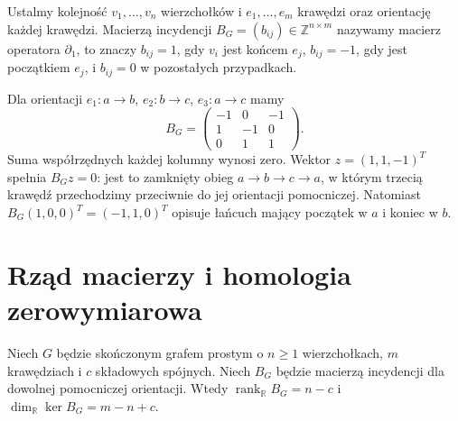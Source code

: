 \begin{definicja}
Ustalmy kolejność $v_1,\ldots,v_n$ wierzchołków i $e_1,\ldots,e_m$
krawędzi oraz orientację każdej krawędzi. Macierzą incydencji
$B_G=(b_{ij})\in\mathbb Z^{n\times m}$ nazywamy macierz operatora
$\partial_1$, to znaczy $b_{ij}=1$, gdy $v_i$ jest końcem $e_j$,
$b_{ij}=-1$, gdy jest początkiem $e_j$, i $b_{ij}=0$ w pozostałych
przypadkach.
\end{definicja}

\begin{center}
\end{center}

\begin{przyklad}
Dla orientacji $e_1:a\to b$, $e_2:b\to c$, $e_3:a\to c$ mamy
\[
B_G=\begin{pmatrix}-1&0&-1\\1&-1&0\\0&1&1\end{pmatrix}.
\]
Suma współrzędnych każdej kolumny wynosi zero. Wektor $z=(1,1,-1)^T$ spełnia
$B_Gz=0$: jest to zamknięty obieg $a\to b\to c\to a$, w którym
trzecią krawędź przechodzimy przeciwnie do jej orientacji pomocniczej.
Natomiast $B_G(1,0,0)^T=(-1,1,0)^T$ opisuje łańcuch mający początek
w $a$ i koniec w $b$.
\end{przyklad}

\section{Rząd macierzy i homologia zerowymiarowa}
\label{sec:tg-rank-incidence}

\begin{twierdzenie}
\label{thm:tg-rank}
Niech $G$ będzie skończonym grafem prostym o $n\ge1$ wierzchołkach,
$m$ krawędziach i $c$ składowych spójnych. Niech $B_G$ będzie
macierzą incydencji dla dowolnej pomocniczej orientacji. Wtedy
$\operatorname{rank}_{\mathbb R}B_G=n-c$ i
$\dim_{\mathbb R}\ker B_G=m-n+c$.
\end{twierdzenie}

